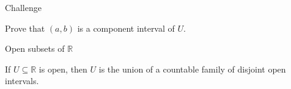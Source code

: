 \documentclass{beamer}
\begin{document}
\begin{frame}{Challenge}
\begin{prob}
Prove that $(a,b)$ is a component interval of $U$.
\end{prob}
\end{frame}

\begin{frame}{Open subsets of $\mathbb{R}$}
\begin{thm}
If $U\subseteq\mathbb{R}$ is open, then $U$ is the union of a countable family of disjoint open intervals.
\end{thm}
\end{frame}
\end{document}

